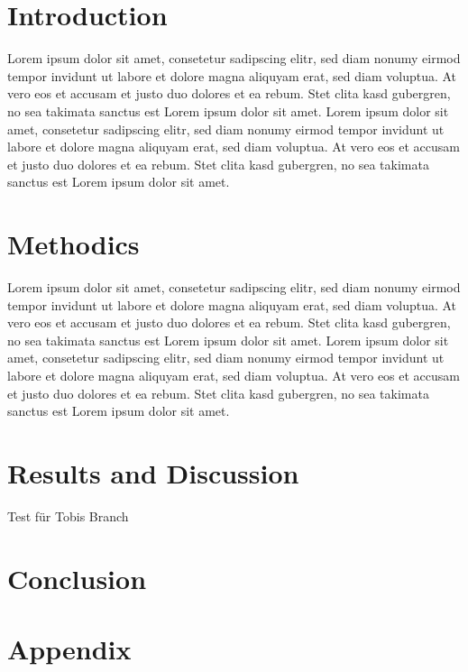 \documentclass[10pt]{article}
\begin{document}
\section*{Introduction}
 Lorem ipsum dolor sit amet, consetetur sadipscing elitr, sed diam nonumy eirmod tempor invidunt ut labore et dolore magna aliquyam erat, sed diam voluptua. At vero eos et accusam et justo duo dolores et ea rebum. Stet clita kasd gubergren, no sea takimata sanctus est Lorem ipsum dolor sit amet. Lorem ipsum dolor sit amet, consetetur sadipscing elitr, sed diam nonumy eirmod tempor invidunt ut labore et dolore magna aliquyam erat, sed diam voluptua. At vero eos et accusam et justo duo dolores et ea rebum. Stet clita kasd gubergren, no sea takimata sanctus est Lorem ipsum dolor sit amet.  

	
\section*{Methodics}

  Lorem ipsum dolor sit amet, consetetur sadipscing elitr, sed diam nonumy eirmod tempor invidunt ut labore et dolore magna aliquyam erat, sed diam voluptua. At vero eos et accusam et justo duo dolores et ea rebum. Stet clita kasd gubergren, no sea takimata sanctus est Lorem ipsum dolor sit amet. Lorem ipsum dolor sit amet, consetetur sadipscing elitr, sed diam nonumy eirmod tempor invidunt ut labore et dolore magna aliquyam erat, sed diam voluptua. At vero eos et accusam et justo duo dolores et ea rebum. Stet clita kasd gubergren, no sea takimata sanctus est Lorem ipsum dolor sit amet.  
 
 
\section*{Results and Discussion}

Test f\"ur Tobis Branch
\section*{Conclusion}

\renewcommand\refname{Bibliography}
	
	 


\section*{Appendix}
\end{document}
